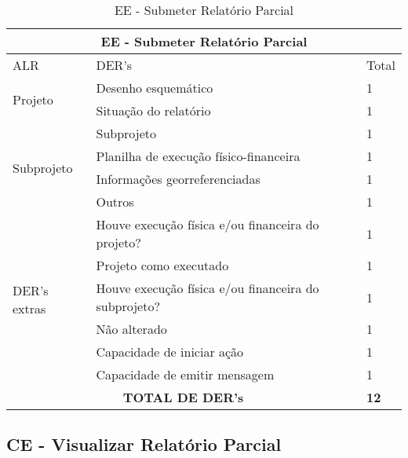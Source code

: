 \begin{table}[!h]
\centering
\caption{EE - Submeter Relatório Parcial}
\label{ee_submeter_relatorio_parcial}
\begin{tabular}{|l|l|l|}
\hline
\multicolumn{3}{|c|}{EE - Submeter Relatório Parcial}                                                                 \\ \hline
ALR                           & DER's                                                & Total              \\ \hline
\multirow{2}{*}{Projeto}    & Desenho esquemático  & 1                  \\ \cline{2-3} 
                             & Situação do relatório & 1 \\ \hline
\multirow{4}{*}{Subprojeto}   & Subprojeto & 1 \\ \cline{2-3}
                              & Planilha de execução físico-financeira               & 1                  \\ \cline{2-3} 
                              & Informações georreferenciadas                        & 1                  \\ \cline{2-3} 
                              & Outros  & 1                  \\ \hline
\multirow{6}{*}{DER's extras} & Houve execução física e/ou financeira do projeto? & 1                  \\ \cline{2-3} 
                              & Projeto como executado & 1 \\ \cline{2-3}
                              & Houve execução física e/ou financeira do subprojeto?    & 1                  \\ \cline{2-3} 
			      & Não alterado                                         & 1                  \\ \cline{2-3} 
                              & Capacidade de iniciar ação                           & 1\\ \cline{2-3}
                              & Capacidade de emitir mensagem                        &1                    \\ \hline
\multicolumn{2}{|c|}{\textbf{TOTAL DE DER's}}                                                 & \textbf{12}                 \\ \hline
\end{tabular}
\end{table}

  \subsection{CE - Visualizar Relatório Parcial}
  
